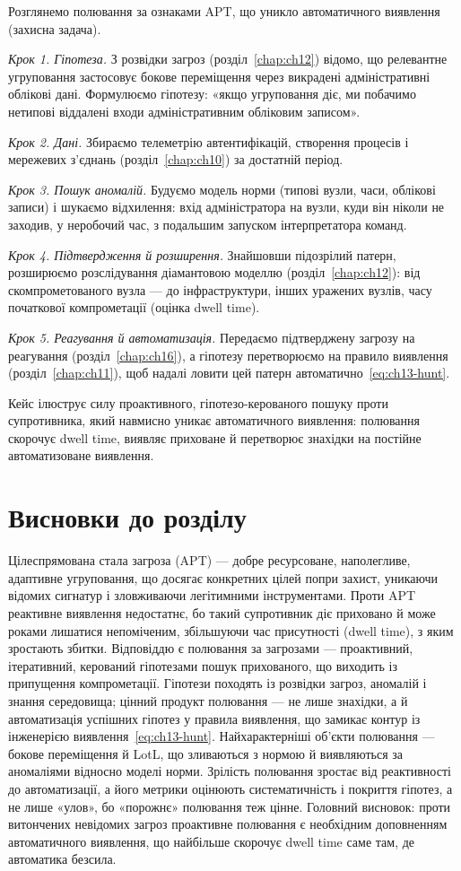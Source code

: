 Розглянемо полювання за ознаками APT, що уникло автоматичного виявлення (захисна задача).

\emph{Крок 1. Гіпотеза.} З розвідки загроз (розділ~\ref{chap:ch12}) відомо, що релевантне угруповання застосовує бокове переміщення через викрадені адміністративні облікові дані. Формулюємо гіпотезу: «якщо угруповання діє, ми побачимо нетипові віддалені входи адміністративним обліковим записом».

\emph{Крок 2. Дані.} Збираємо телеметрію автентифікацій, створення процесів і мережевих з'єднань (розділ~\ref{chap:ch10}) за достатній період.

\emph{Крок 3. Пошук аномалій.} Будуємо модель норми (типові вузли, часи, облікові записи) і шукаємо відхилення: вхід адміністратора на вузли, куди він ніколи не заходив, у неробочий час, з подальшим запуском інтерпретатора команд.

\emph{Крок 4. Підтвердження й розширення.} Знайшовши підозрілий патерн, розширюємо розслідування діамантовою моделлю (розділ~\ref{chap:ch12}): від скомпрометованого вузла --- до інфраструктури, інших уражених вузлів, часу початкової компрометації (оцінка dwell time).

\emph{Крок 5. Реагування й автоматизація.} Передаємо підтверджену загрозу на реагування (розділ~\ref{chap:ch16}), а гіпотезу перетворюємо на правило виявлення (розділ~\ref{chap:ch11}), щоб надалі ловити цей патерн автоматично~\eqref{eq:ch13-hunt}.

Кейс ілюструє силу проактивного, гіпотезо-керованого пошуку проти супротивника, який навмисно уникає автоматичного виявлення: полювання скорочує dwell time, виявляє приховане й перетворює знахідки на постійне автоматизоване виявлення.

\section*{Висновки до розділу}

Цілеспрямована стала загроза (APT) --- добре ресурсоване, наполегливе, адаптивне угруповання, що досягає конкретних цілей попри захист, уникаючи відомих сигнатур і зловживаючи легітимними інструментами. Проти APT реактивне виявлення недостатнє, бо такий супротивник діє приховано й може роками лишатися непоміченим, збільшуючи час присутності (dwell time), з яким зростають збитки. Відповіддю є полювання за загрозами --- проактивний, ітеративний, керований гіпотезами пошук прихованого, що виходить із припущення компрометації. Гіпотези походять із розвідки загроз, аномалій і знання середовища; цінний продукт полювання --- не лише знахідки, а й автоматизація успішних гіпотез у правила виявлення, що замикає контур із інженерією виявлення~\eqref{eq:ch13-hunt}. Найхарактерніші об'єкти полювання --- бокове переміщення й LotL, що зливаються з нормою й виявляються за аномаліями відносно моделі норми. Зрілість полювання зростає від реактивності до автоматизації, а його метрики оцінюють систематичність і покриття гіпотез, а не лише «улов», бо «порожнє» полювання теж цінне. Головний висновок: проти витончених невідомих загроз проактивне полювання є необхідним доповненням автоматичного виявлення, що найбільше скорочує dwell time саме там, де автоматика безсила.

